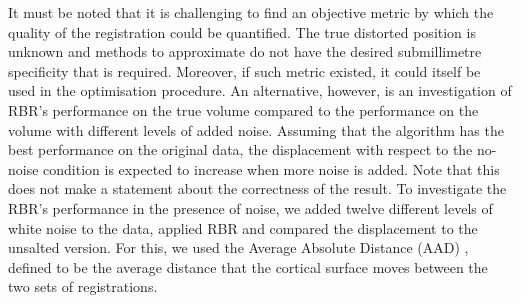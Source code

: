 It must be noted that it is challenging to find an objective metric by which the quality of the registration could be quantified. The true distorted position is unknown and methods to approximate do not have the desired submillimetre specificity that is required. Moreover, if such metric existed, it could itself be used in the optimisation procedure. An alternative, however, is an investigation of RBR's performance on the true volume compared to the performance on the volume with different levels of added noise. Assuming that the algorithm has the best performance on the original data, the displacement with respect to the no-noise condition is expected to increase when more noise is added. Note that this does not make a statement about the correctness of the result. To investigate the RBR's performance in the presence of noise, we added twelve different levels of white noise to the data, applied RBR and compared the displacement to the unsalted version. For this, we used the Average Absolute Distance (AAD) \cite{Greve2009}, defined to be the average distance that the cortical surface moves between the two sets of registrations.
